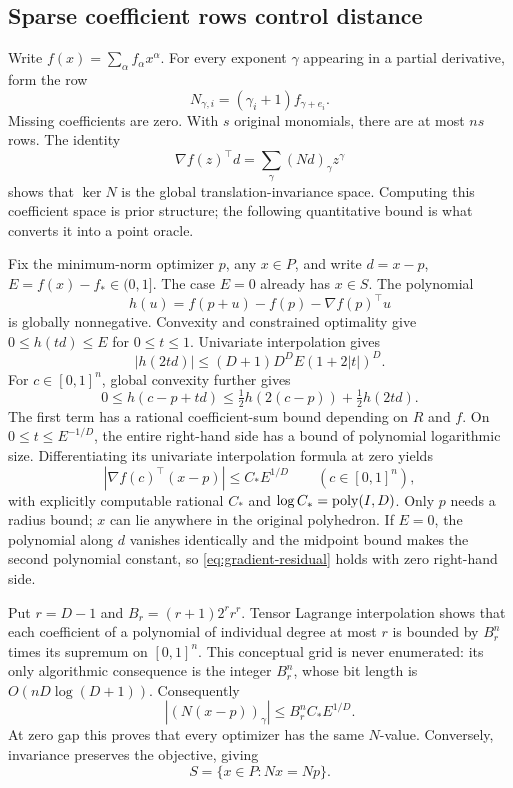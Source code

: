 \subsection{Sparse coefficient rows control distance}

Write $f(x)=\sum_\alpha f_\alpha x^\alpha$. For every exponent $\gamma$
appearing in a partial derivative, form the row
\[
 N_{\gamma,i}=(\gamma_i+1)f_{\gamma+e_i}.
\]
Missing coefficients are zero. With $s$ original monomials, there are at
most $ns$ rows. The identity
\[
 \nabla f(z)^\top d=\sum_\gamma (Nd)_\gamma z^\gamma
\]
shows that $\ker N$ is the global translation-invariance space. Computing
this coefficient space is prior structure; the following quantitative bound
is what converts it into a point oracle.

Fix the minimum-norm optimizer $p$, any $x\in P$, and write
$d=x-p$, $E=f(x)-f_*\in(0,1]$. The case $E=0$ already has $x\in S$.
The polynomial
\[
 h(u)=f(p+u)-f(p)-\nabla f(p)^\top u
\]
is globally nonnegative. Convexity and constrained optimality give
$0\le h(td)\le E$ for $0\le t\le1$. Univariate interpolation gives
\[
 |h(2td)|\le (D+1)D^D E(1+2|t|)^D.
\]
For $c\in[0,1]^n$, global convexity further gives
\[
 0\le h(c-p+td)\le\tfrac12h(2(c-p))+\tfrac12h(2td).
\]
The first term has a rational coefficient-sum bound depending on $R$ and
$f$. On $0\le t\le E^{-1/D}$, the entire right-hand side has a bound
of polynomial logarithmic size. Differentiating its univariate
interpolation formula at zero yields
\begin{equation}\label{eq:gradient-residual}
 |\nabla f(c)^\top(x-p)|\le C_* E^{1/D}
 \qquad(c\in[0,1]^n),
\end{equation}
with explicitly computable rational $C_*$ and
$\log C_*=\operatorname{poly}(I,D)$. Only $p$ needs a radius bound; $x$ can lie anywhere
in the original polyhedron. If $E=0$, the polynomial along $d$ vanishes
identically and the midpoint bound makes the second polynomial constant,
so \eqref{eq:gradient-residual} holds with zero right-hand side.

Put $r=D-1$ and $B_r=(r+1)2^r r^r$. Tensor Lagrange interpolation shows
that each coefficient of a polynomial of individual degree at most $r$ is
bounded by $B_r^n$ times its supremum on $[0,1]^n$. This conceptual grid
is never enumerated: its only algorithmic consequence is the integer
$B_r^n$, whose bit length is $O(nD\log(D+1))$. Consequently
\[
 |(N(x-p))_\gamma|\le B_r^n C_* E^{1/D}.
\]
At zero gap this proves that every optimizer has the same $N$-value.
Conversely, invariance preserves the objective, giving
\begin{equation}\label{eq:optimizer-slice}
 S=\{x\in P:Nx=Np\}.
\end{equation}

